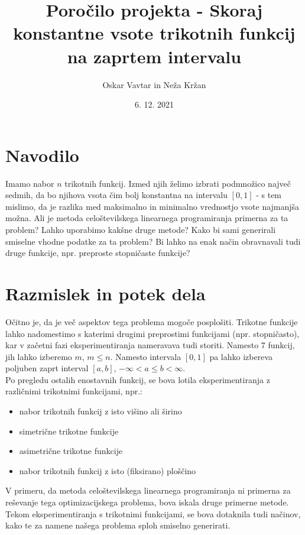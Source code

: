 \documentclass[11pt]{article}
\title{Poročilo projekta - Skoraj konstantne vsote trikotnih funkcij na zaprtem intervalu}
\author{Oskar Vavtar in Neža Kržan}
\date{6. 12. 2021}
\theoremstyle{definition}
\newcommand{\1}{\mathbbm{1}}
\begin{document}
\maketitle

\section{Navodilo}
\vspace{0.5cm}

Imamo nabor $n$ trikotnih funkcij. Izmed njih želimo izbrati podmnožico največ sedmih, da bo njihova vsota čim bolj konstantna na intervalu $[0,1]$ - s tem mislimo, da je razlika med maksimalno in minimalno vrednostjo vsote najmanjša možna. Ali je metoda celoštevilskega linearnega programiranja primerna za ta problem? Lahko uporabimo kakšne druge metode? Kako bi sami generirali smiselne vhodne podatke za ta problem? Bi lahko na enak način obravnavali tudi druge funkcije, npr. preproste stopničaste funkcije?

\section{Razmislek in potek dela}
\vspace{0.5cm}

Očitno je, da je več aspektov tega problema mogoče posplošiti. Trikotne funkcije lahko nadomestimo s katerimi drugimi preprostimi funkcijami (npr. stopničasto), kar v začetni fazi eksperimentiranja nameravava tudi storiti. Namesto 7 funkcij, jih lahko izberemo $m$, $m \leq n$. Namesto intervala $[0,1]$ pa lahko izbereva poljuben zaprt interval $[a,b]$, $-\infty < a \leq b < \infty$. \\

\noindent Po pregledu ostalih enostavnih funkcij, se bova lotila eksperimentiranja z različnimi trikotnimi funkcijami, npr.:
\begin{itemize}
	\item nabor trikotnih funkcij z isto višino ali širino
	\item simetrične trikotne funkcije
	\item asimetrične trikotne funkcije
	\item nabor trikotnih funkcij z isto (fiksirano) ploščino
\end{itemize}
\vspace{0.5cm}

\noindent V primeru, da metoda celoštevilskega linearnega programiranja ni primerna za reševanje tega optimizacijskega problema, bova iskala druge primerne metode. Tekom eksperimentiranja s trikotnimi funkcijami, se bova dotaknila tudi načinov, kako te za namene našega problema sploh smiselno generirati. \\
\end{document}

